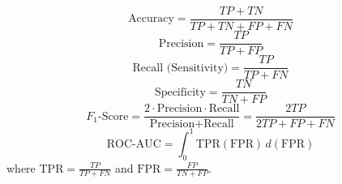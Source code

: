 \begin{equation}
    \text{Accuracy} = \frac{TP + TN}{TP + TN + FP + FN}
    \label{eq:accuracy}
\end{equation}
\begin{equation}
    \text{Precision} = \frac{TP}{TP + FP}
    \label{eq:precision}
\end{equation}
\begin{equation}
    \text{Recall (Sensitivity)} = \frac{TP}{TP + FN}
    \label{eq:recall}
\end{equation}
\begin{equation}
    \text{Specificity} = \frac{TN}{TN + FP}
    \label{eq:specificity}
\end{equation}
\begin{equation}
    F_1\text{-Score} = \frac{2 \cdot \text{Precision} \cdot \text{Recall}}{\text{Precision} + \text{Recall}} = \frac{2 TP}{2 TP + FP + FN}
    \label{eq:f1}
\end{equation}
\begin{equation}
    \text{ROC-AUC} = \int_{0}^{1} \text{TPR}(\text{FPR}) \, d(\text{FPR})
    \label{eq:roc_auc}
\end{equation}
where $\text{TPR} = \frac{TP}{TP + FN}$ and $\text{FPR} = \frac{FP}{TN + FP}$.

